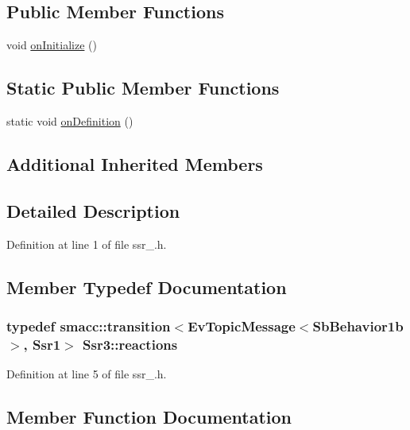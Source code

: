 \subsection*{Public Member Functions}
\begin{DoxyCompactItemize}
\item 
void \hyperlink{structSsr3_aa20ad5030a625d39522d559ebe75feb0}{on\+Initialize} ()
\end{DoxyCompactItemize}
\subsection*{Static Public Member Functions}
\begin{DoxyCompactItemize}
\item 
static void \hyperlink{structSsr3_a57a64c1b26c2967aff8f55077f0b2553}{on\+Definition} ()
\end{DoxyCompactItemize}
\subsection*{Additional Inherited Members}


\subsection{Detailed Description}


Definition at line 1 of file ssr\+\_.\+h.



\subsection{Member Typedef Documentation}
\subsubsection[{\texorpdfstring{reactions}{reactions}}]{\setlength{\rightskip}{0pt plus 5cm}typedef {\bf smacc\+::transition}$<$Ev\+Topic\+Message$<$Sb\+Behavior1b$>$, {\bf Ssr1}$>$ {\bf Ssr3\+::reactions}}\hypertarget{structSsr3_abadc028b9814c44114b1eda6520c6874}{}\label{structSsr3_abadc028b9814c44114b1eda6520c6874}


Definition at line 5 of file ssr\+\_.\+h.



\subsection{Member Function Documentation}
